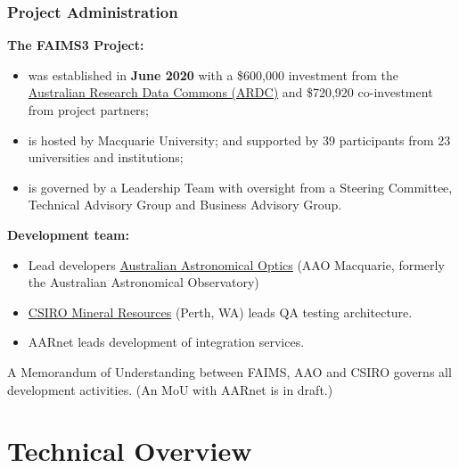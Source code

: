 \documentclass[
	aspectratio=169, %
	11pt, %
	t, %
]{beamer}
\begin{document}
\begin{frame}%
	\frametitle{Project Administration}
    \textbf{The FAIMS3 Project:}
    
    \begin{itemize}
        \item was established in \textbf{June 2020} with a \$600,000 investment from the \href{https://ardc.edu.au/project/faims-3-0-electronic-field-notebooks/}{Australian Research Data Commons (ARDC)} and \$720,920 co-investment from project partners; 
        \item is hosted by Macquarie University; and supported by 39 participants from 23 universities and institutions; 
        \item is governed by a Leadership Team with oversight from a Steering Committee, Technical Advisory Group and Business Advisory Group.
 
    \end{itemize}
    
\textbf{Development team:}   
    
    \begin{itemize}
        \item Lead developers \href{https://www.aao.gov.au/}{Australian Astronomical Optics} (AAO Macquarie, formerly the Australian Astronomical Observatory)
        \item \href{https://www.csiro.au/en/about/people/business-units/mineral-resources}{ CSIRO Mineral Resources} (Perth, WA) leads QA testing architecture.
        \item AARnet leads development of integration services. 

    \end{itemize}

A Memorandum of Understanding between FAIMS, AAO and CSIRO governs all development activities. (An MoU with AARnet is in draft.)  



\end{frame} 


\section{Technical Overview}
\end{document}
